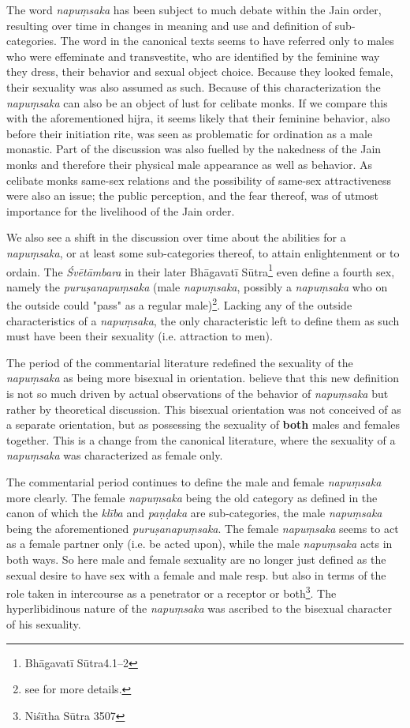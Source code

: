The word {\em napuṃsaka} has been subject to much debate within the Jain order, resulting over time in changes in meaning and use and definition of sub-categories. The word in the canonical texts seems to have referred only to males who were effeminate and transvestite, who are identified by the feminine way they dress, their behavior and sexual object choice. Because they looked female, their sexuality was also assumed as such. Because of this characterization the {\em napuṃsaka} can also be an object of lust for celibate monks. If we compare this with the aforementioned hijra, it seems likely that their feminine behavior, also before their initiation rite, was seen as problematic for ordination as a male monastic. Part of the discussion was also fuelled by the nakedness of the Jain monks and therefore their physical male appearance as well as behavior. As celibate monks same-sex relations and the possibility of same-sex attractiveness were also an issue; the public perception, and the fear thereof, was of utmost importance for the livelihood of the Jain order. 

We also see a shift in the discussion over time about the abilities for a {\em napuṃsaka}, or at least some sub-categories thereof, to attain enlightenment or to ordain. The {\em Śvētāmbara} in their later Bhāgavatī Sūtra\footnote{Bhāgavatī Sūtra4.1–2} even define a fourth sex, namely the {\em puruṣanapuṃsaka} (male {\em napuṃsaka}, possibly a {\em napuṃsaka} who on the outside could "pass" as a regular male)\footnote{see \cite{zwilling} for more details.}. Lacking any of the outside characteristics of a {\em napuṃsaka}, the only characteristic left to define them as such must have been their sexuality (i.e. attraction to men).

The period of the commentarial literature redefined the sexuality of the {\em napuṃsaka} as being more bisexual in orientation. \cite{zwilling} believe that this new definition is not so much driven by actual observations of the behavior of {\em napuṃsaka} but rather by theoretical discussion. This bisexual orientation was not conceived of as a separate orientation, but as possessing the sexuality of \textbf{both} males and females together. This is a change from the canonical literature, where the sexuality of a {\em napuṃsaka} was characterized as female only.

The commentarial period continues to define the male and female {\em napuṃsaka} more clearly. The female {\em napuṃsaka} being the old category as defined in the canon of which the {\em klība} and {\em paṇḍaka} are sub-categories, the male {\em napuṃsaka} being the aforementioned {\em puruṣanapuṃsaka}. The female {\em napuṃsaka} seems to act as a female partner only (i.e. be acted upon), while the male {\em napuṃsaka} acts in both ways. So here male and female sexuality are no longer just defined as the sexual desire to have sex with a female and male resp. but also in terms of the role taken in intercourse as a penetrator or a receptor or both\footnote{Niśītha Sūtra 3507}. The hyperlibidinous nature of the {\em napuṃsaka} was ascribed to the bisexual character of his sexuality.

